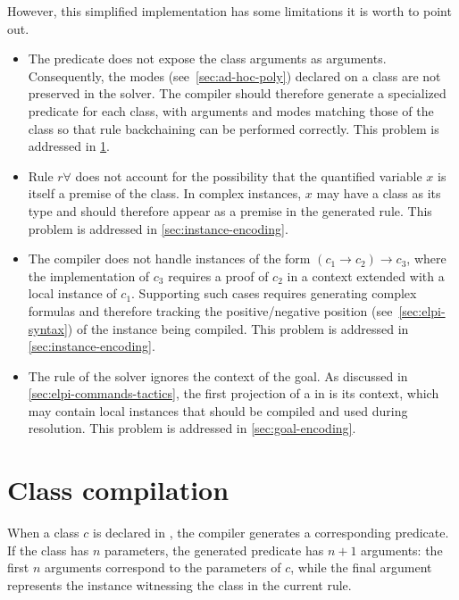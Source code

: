 However, this
simplified implementation has some limitations it is worth to point out.

\begin{itemize}
  \item The predicate  does not expose the class arguments as \elpi
        arguments. Consequently, the \rocq modes (see~\cref{sec:ad-hoc-poly}) declared on a class are not preserved
        in the \elpi solver. The compiler should therefore generate a specialized
        predicate for each class, with arguments and modes matching those of the
        class so that rule backchaining can be performed correctly. This problem
        is addressed in \cref{sec:class-encoding}.
  \item Rule $r\forall$ does not account for the possibility that the quantified
        variable $x$ is itself a premise of the class. In complex instances,
        $x$ may have a class as its type and should therefore appear as a
        premise in the generated rule. This problem is addressed in
        \cref{sec:instance-encoding}.
  \item The compiler does not handle instances of the form
        $(c_1 \to c_2) \to c_3$, where the implementation of $c_3$ requires a
        proof of $c_2$ in a context extended with a local instance of $c_1$.
        Supporting such cases requires generating 
        complex formulas and therefore tracking the positive/negative
        position (see~\cref{sec:elpi-syntax}) of the instance being
        compiled. This problem is addressed in
        \cref{sec:instance-encoding}.
  \item The  rule of the solver ignores the context of the goal. As
        discussed in \cref{sec:elpi-commands-tactics}, the first projection of a
         in \rocqelpi is its context, which may contain local
        instances that should be compiled and used during resolution. This
        problem is addressed in \cref{sec:goal-encoding}.
\end{itemize}

\section{Class compilation}
\label{sec:class-encoding}

When a class $c$ is declared in \rocq, the compiler generates a corresponding
\elpi predicate. If the class has $n$ parameters, the generated predicate has
$n+1$ arguments: the first $n$ arguments correspond to the parameters of $c$,
while the final argument represents the instance witnessing the class in the
current rule.

